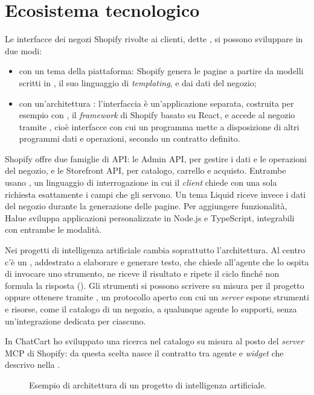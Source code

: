 
\section{Ecosistema tecnologico}
\label{sec:ecosistema}

Le interfacce dei negozi Shopify rivolte ai clienti, dette , si
possono sviluppare in due modi:

\begin{itemize}
        \item con un tema della piattaforma: Shopify genera le pagine a partire da modelli scritti in
	, il suo linguaggio di \emph{templating}, e dai dati del negozio;
        \item con un’architettura : l’interfaccia è un’applicazione
	separata, costruita per esempio con , il \emph{framework} di Shopify
	basato su React, e accede al negozio tramite , cioè interfacce con cui un
	programma mette a disposizione di altri programmi dati e operazioni, secondo un contratto definito.
\end{itemize}

Shopify offre due famiglie di API: le Admin API, per gestire i dati e le operazioni del negozio, e
le Storefront API, per catalogo, carrello e acquisto. Entrambe usano , un
linguaggio di interrogazione in cui il \emph{client} chiede con una sola richiesta esattamente i
campi che gli servono. Un tema Liquid riceve invece i dati del negozio durante la generazione delle
pagine. Per aggiungere funzionalità, Halue sviluppa applicazioni personalizzate in Node.js e
TypeScript, integrabili con entrambe le modalità.

Nei progetti di intelligenza artificiale cambia soprattutto l’architettura. Al centro c’è un
, addestrato a elaborare e generare
testo, che chiede all’agente che lo ospita di invocare uno strumento, ne riceve il risultato e
ripete il ciclo finché non formula la risposta (). Gli strumenti si possono
scrivere su misura per il progetto oppure ottenere tramite , un protocollo aperto
con cui un \emph{server} espone strumenti e risorse, come il catalogo di un negozio, a qualunque
agente lo supporti, senza un’integrazione dedicata per ciascuno.

In ChatCart ho sviluppato una ricerca nel catalogo su misura al posto del \emph{server} MCP di
Shopify: da questa scelta nasce il contratto tra agente e \emph{widget} che descrivo nella
.

\begin{figure}[htbp]
	\centering
	
	\caption{Esempio di architettura di un progetto di intelligenza artificiale.}
	\label{fig:agente}
\end{figure}
